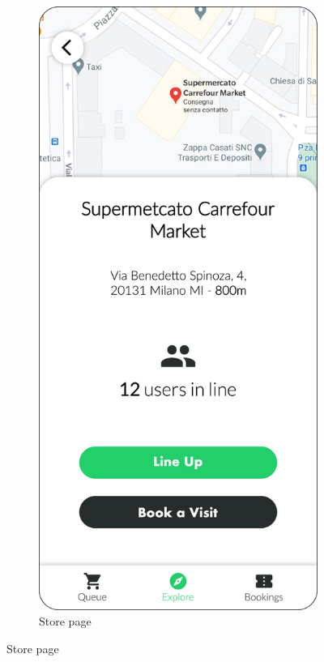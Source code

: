 \begin{figure}[H]
\begin{subfigure}[t]{0.28\textwidth}
    \end{subfigure}
    \quad
    \begin{subfigure}[t]{0.28\textwidth} 
        \includegraphics{../mockups/store}
        \caption*{Store page}

\end{subfigure}
\end{figure}
